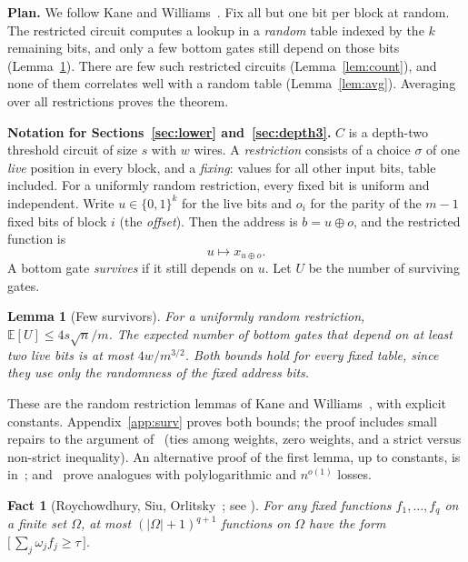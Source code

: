 \documentclass[11pt,letterpaper]{article}
\newtheorem{lemma}[theorem]{Lemma}
\newtheorem{fact}[theorem]{Fact}
\theoremstyle{remark}
\newcommand{\bits}{\{0,1\}}
\newcommand{\ind}[1]{\bigl[\,#1\,\bigr]}
\newcommand{\smalltitle}[1]{\textbf{\color{ink}#1}\quad}
\begin{document}
\smalltitle{Plan.}
We follow Kane and Williams~\cite{KW}. Fix all but one bit per block at
random. The restricted circuit computes a lookup in a \emph{random} table
indexed by the $k$ remaining bits, and only a few bottom gates still depend
on those bits (Lemma~\ref{lem:surv}). There are few such restricted circuits
(Lemma~\ref{lem:count}), and none of them correlates well with a random
table (Lemma~\ref{lem:avg}). Averaging over all restrictions proves the
theorem.

\begin{keybox}
\textbf{Notation for Sections~\ref{sec:lower} and~\ref{sec:depth3}.}
$C$ is a depth-two threshold circuit of size $s$ with $w$ wires.
A \emph{restriction} consists of a choice $\sigma$ of one \emph{live}
position in every block, and a \emph{fixing}: values for all other input
bits, table included. For a uniformly random restriction, every fixed bit
is uniform and independent. Write $u\in\bits^k$ for the live bits and
$o_i$ for the parity of the $m-1$ fixed bits of block $i$ (the
\emph{offset}). Then the address is $b=u\oplus o$, and the restricted
function is
\[
u\mapsto x_{u\oplus o}.
\]
A bottom gate \emph{survives} if it still depends on $u$. Let $U$ be the
number of surviving gates.
\end{keybox}

\begin{lemma}[Few survivors]\label{lem:surv}
For a uniformly random restriction, $\mathbb E[U]\le4s\sqrt n/m$. The
expected number of bottom gates that depend on at least two live bits is at
most $4w/m^{3/2}$. Both bounds hold for every fixed table, since they use
only the randomness of the fixed address bits.
\end{lemma}
These are the random restriction lemmas of Kane and
Williams~\cite[Lemmas~1.1 and~3.1]{KW}, with explicit constants.
Appendix~\ref{app:surv} proves both bounds; the proof includes small repairs
to the argument of~\cite{KW} (ties among weights, zero weights, and a strict
versus non-strict inequality). An alternative proof of the first lemma, up to
constants, is in~\cite[App.~A.3]{CTW}; \cite[Lemma~6.1]{KKL}
and~\cite[Lemma~9.1]{CSS} prove analogues with polylogarithmic and $n^{o(1)}$
losses.

\begin{fact}[Roychowdhury, Siu, Orlitsky~\cite{RSO}; see {\cite[Thm.~2.3]{KW}}]\label{fact:rso}
For any fixed functions $f_1,\dots,f_q$ on a finite set $\Omega$, at most
$(|\Omega|+1)^{q+1}$ functions on $\Omega$ have the form
$\ind{\sum_j\omega_jf_j\ge\tau}$.
\end{fact}
\end{document}

